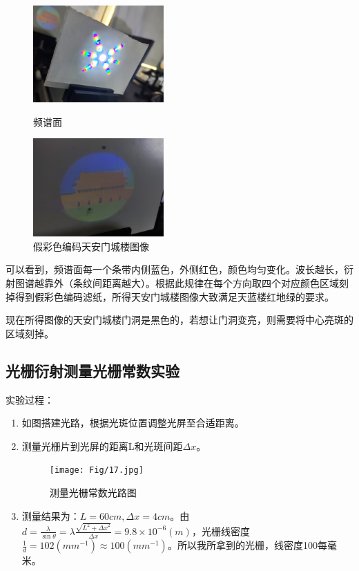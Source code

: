 \documentclass[11pt]{article}
\begin{document}
\begin{enumerate}
\begin{figure}[H]
\begin{minipage}[t]{0.33\linewidth}
            \centering
            \includegraphics[width=5cm]{Fig/15.jpg}
            \caption{频谱面}
        \end{minipage}
        \begin{minipage}[t]{0.33\linewidth}
            \centering
            \includegraphics[width=5cm]{Fig/16.jpg}
            \caption{假彩色编码天安门城楼图像}
        \end{minipage}
    \end{figure} 
    \par \hspace*{2em}可以看到，频谱面每一个条带内侧蓝色，外侧红色，颜色均匀变化。波长越长，衍射图谱越靠外（条纹间距离越大）。根据此规律在每个方向取四个对应颜色区域刻掉得到假彩色编码滤纸，所得天安门城楼图像大致满足天蓝楼红地绿的要求。
    \par \hspace*{2em}现在所得图像的天安门城楼门洞是黑色的，若想让门洞变亮，则需要将中心亮斑的区域刻掉。

\end{enumerate}

\subsection{光栅衍射测量光栅常数实验}
\noindent 实验过程：
\begin{enumerate}
    \item 如图搭建光路，根据光斑位置调整光屏至合适距离。
    \item 测量光栅片到光屏的距离L和光斑间距$\Delta x$。
    \begin{figure}[H]
        \centering
        \texttt{[image: Fig/17.jpg]}
        \caption{测量光栅常数光路图}
    \end{figure}
    \item 测量结果为：$L=60cm,\Delta x =4cm$。由$d=\frac{\lambda}{\sin \theta}=\lambda\frac{\sqrt{L^2+{\Delta x}^2}}{\Delta x}=9.8\times 10^{-6}(m)$，光栅线密度$\frac{1}{d}=102(mm^{-1})\approx 100(mm^{-1})$。所以我所拿到的光栅，线密度100每毫米。

\end{enumerate}
\end{document}
